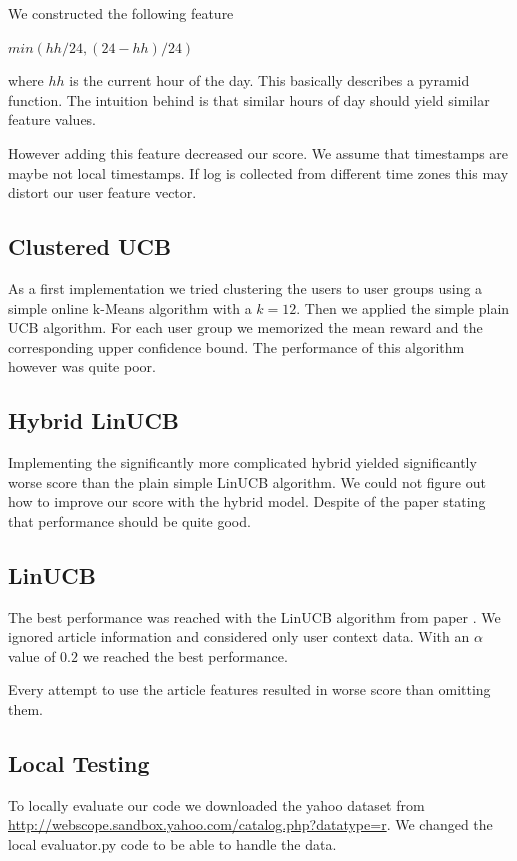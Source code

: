 \documentclass[a4paper, 11pt]{article}
\begin{document}
We constructed the following feature 

$ min\left(  hh / 24, (24 - hh) / 24\right)$

where $hh$ is the current hour of the day. This basically describes a pyramid function. The intuition behind is that similar hours of day should yield similar feature values.

However adding this feature decreased our score. We assume that timestamps are maybe not local timestamps. If log is collected from different time zones this may distort our user feature vector.


\subsection{Clustered UCB}
As a first implementation we tried clustering the users to user groups using a simple online k-Means algorithm with a $k=12$. Then we applied the simple plain UCB algorithm. For each user group we memorized the mean reward and the corresponding upper confidence bound. The performance of this algorithm however was quite poor.

\subsection{Hybrid LinUCB}
Implementing the significantly more complicated hybrid yielded significantly worse score than the plain simple LinUCB algorithm. We could not figure out how to improve our score with the hybrid model. Despite of the paper stating that performance should be quite good.

\subsection{LinUCB}
The best performance was reached with the LinUCB algorithm from paper \cite{li2010contextual}. We ignored article information and considered only user context data. With an $\alpha$ value of $0.2$ we reached the best performance. 

Every attempt to use the article features resulted in worse score than omitting them.

\subsection{Local Testing}
To locally evaluate our code we downloaded the yahoo dataset from \url{http://webscope.sandbox.yahoo.com/catalog.php?datatype=r}. We changed the local evaluator.py code to be able to handle the data.



\end{document}
